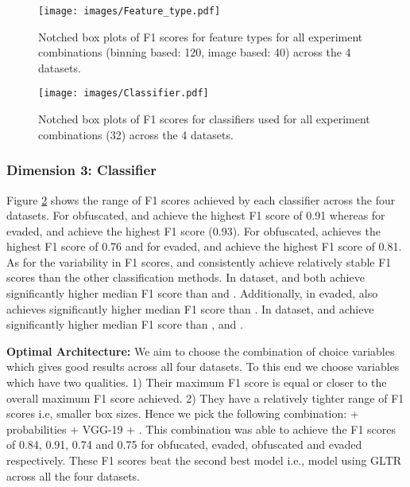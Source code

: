 \begin{figure}
  \centering
  \texttt{[image: images/Feature\_type.pdf]}
  \caption{Notched box plots of F1 scores for feature types for all experiment combinations (binning based: 120, image based: 40) across the 4 datasets.}\label{ft}
\end{figure}


\begin{figure}
  \centering
  \texttt{[image: images/Classifier.pdf]}
  \caption{Notched box plots of F1 scores for classifiers used for all experiment combinations (32) across the 4 datasets.}\label{c}
\end{figure}

\subsubsection{Dimension 3: Classifier}
%
Figure \ref{c} shows the range of F1 scores achieved by each classifier across the four datasets.
%
For \amt obfuscated, \knn and \nueralnetworks achieve the highest F1 score of 0.91 whereas for \amt evaded, \nueralnetworks and \rfc achieve the highest F1 score (0.93).
%
For \blogs obfuscated, \svm achieves the highest F1 score of 0.76 and for \blogs evaded, \knn and \naivebayes achieve the highest F1 score of 0.81.
%
As for the variability in F1 scores, \knn and \nueralnetworks consistently achieve relatively stable F1 scores than the other classification methods.
%
In \amt dataset, \knn and \nueralnetworks both achieve significantly higher median F1 score than \svm and \rfc.
%
Additionally, in \amt evaded, \knn also achieves significantly higher median F1 score than \naivebayes.
%
In \blogs dataset, \knn and \ann achieve significantly higher median F1 score than \svm, \rfc and \naivebayes.

\vspace{0.05in} \noindent \textbf{Optimal Architecture:}
We aim to choose the combination of choice variables which gives good results across all four datasets.
%
To this end we choose variables which have two qualities.
%
1) Their maximum F1 score is equal or closer to the overall maximum F1 score achieved.
%
2) They have a relatively tighter range of F1 scores i.e, smaller box sizes.
%
Hence we pick the following combination: \bertsmall + probabilities + VGG-19 + \nueralnetworks.
%
This combination was able to achieve the F1 scores of 0.84, 0.91, 0.74 and 0.75 for \amt obfucated, \amt evaded, \blogs obfuscated and \blogs evaded respectively.
% 
These F1 scores beat the second best model i.e., model using GLTR across all the four datasets.


